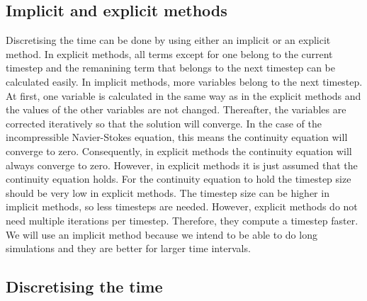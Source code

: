 \documentclass{article}
\begin{document}
\subsection{Implicit and explicit methods} \label{implicit and explicit}
Discretising the time can be done by using either an implicit or an explicit method.\cite{enterfea} In explicit methods, all terms except for one belong to the current timestep and the remanining term that belongs to the next timestep can be calculated easily.\cite{enterfea} In implicit methods, more variables belong to the next timestep. At first, one variable is calculated in the same way as in the explicit methods and the values of the other variables are not changed. \cite{enterfea} Thereafter, the variables  are corrected iteratively so that the solution will converge. \cite{enterfea} In the case of the incompressible Navier-Stokes equation, this means the continuity equation will converge to zero. Consequently, in explicit methods the continuity equation will always converge to zero. However, in explicit methods it is just assumed that the continuity equation holds. For the continuity equation to hold the timestep size should be very low in explicit methods. \cite{enterfea} The timestep size can be higher in implicit methods, so less timesteps are needed. \cite{enterfea} However, explicit methods do not need multiple iterations per timestep. Therefore, they compute a timestep faster.\cite{enterfea} We will use an implicit method because we intend to be able to do long simulations and they are better for larger time intervals.\cite{enterfea}


\subsection{Discretising the time}
\end{document}
